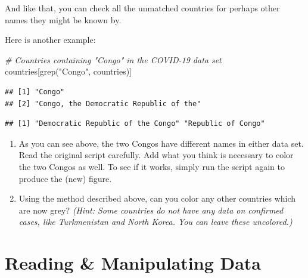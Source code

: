 \documentclass[
]{book}
\newenvironment{Shaded}{\begin{snugshade}}{\end{snugshade}}
\newcommand{\CommentTok}[1]{\textcolor[rgb]{0.56,0.35,0.01}{\textit{#1}}}
\newcommand{\FunctionTok}[1]{\textcolor[rgb]{0.00,0.00,0.00}{#1}}
\newcommand{\NormalTok}[1]{#1}
\newcommand{\SpecialCharTok}[1]{\textcolor[rgb]{0.00,0.00,0.00}{#1}}
\newcommand{\StringTok}[1]{\textcolor[rgb]{0.31,0.60,0.02}{#1}}
\providecommand{\tightlist}{%
  \setlength{\itemsep}{0pt}\setlength{\parskip}{0pt}}
\begin{document}
And like that, you can check all the unmatched countries for perhaps other names they might be known by.

Here is another example:

\begin{Shaded}
\begin{Highlighting}[]
\CommentTok{\# Countries containing "Congo" in the COVID{-}19 data set}
\NormalTok{countries[}\FunctionTok{grep}\NormalTok{(}\StringTok{"Congo"}\NormalTok{, countries)]}
\end{Highlighting}
\end{Shaded}

\begin{verbatim}
## [1] "Congo"                                
## [2] "Congo, the Democratic Republic of the"
\end{verbatim}

\begin{Shaded}
\end{Shaded}

\begin{verbatim}
## [1] "Democratic Republic of the Congo" "Republic of Congo"
\end{verbatim}

\begin{enumerate}
\def\labelenumi{\arabic{enumi}.}
\tightlist
\item
  As you can see above, the two Congos have different names in either data set. Read the original script carefully. Add what you think is necessary to color the two Congos as well. To see if it works, simply run the script again to produce the (new) figure.
\item
  Using the method described above, can you color any other countries which are now grey? \emph{(Hint: Some countries do not have any data on confirmed cases, like Turkmenistan and North Korea. You can leave these uncolored.)}
\end{enumerate}

\hypertarget{data-manipulation}{%
\chapter{Reading \& Manipulating Data}\label{data-manipulation}}
\end{document}
